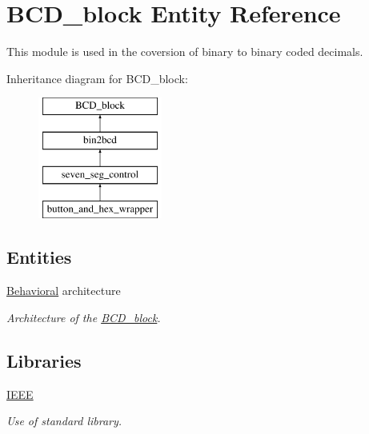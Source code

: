 \hypertarget{classBCD__block}{\section{B\-C\-D\-\_\-block Entity Reference}
\label{classBCD__block}
}


This module is used in the coversion of binary to binary coded decimals.  


Inheritance diagram for B\-C\-D\-\_\-block\-:\begin{figure}[H]
\begin{center}
\leavevmode
\includegraphics[height=4.000000cm]{classBCD__block}
\end{center}
\end{figure}
\subsection*{Entities}
\begin{DoxyCompactItemize}
\item 
\hyperlink{classBCD__block_1_1Behavioral}{Behavioral} architecture
\begin{DoxyCompactList}\small\item\em Architecture of the \hyperlink{classBCD__block}{B\-C\-D\-\_\-block}. \end{DoxyCompactList}\end{DoxyCompactItemize}
\subsection*{Libraries}
 \begin{DoxyCompactItemize}
\item 
\hypertarget{classBCD__block_ae4f03c286607f3181e16b9aa12d0c6d4}{\hyperlink{classBCD__block_ae4f03c286607f3181e16b9aa12d0c6d4}{I\-E\-E\-E} }\label{classBCD__block_ae4f03c286607f3181e16b9aa12d0c6d4}

\begin{DoxyCompactList}\small\item\em Use of standard library. \end{DoxyCompactList}\end{DoxyCompactItemize}
